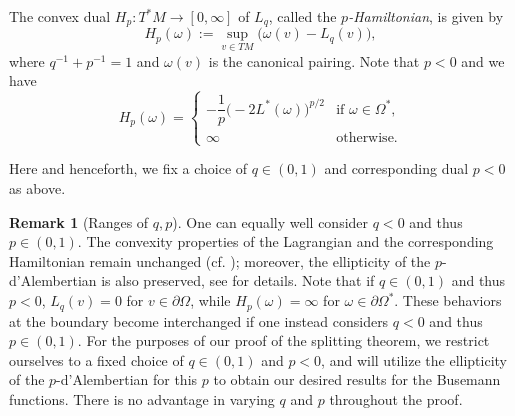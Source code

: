 \documentclass[a4paper,11pt]{article}
\numberwithin{equation}{section}
\theoremstyle{definition}
\newtheorem{remark}[definition]{Remark}
\theoremstyle{plain}
\newcommand{\lra}{\longrightarrow}
\begin{document}
The convex dual $H_p \colon T^*M \lra [0,\infty]$ of $L_q$,
called the \emph{$p$-Hamiltonian}, is given by
\begin{equation*}%
H_p(\omega) := \sup_{v \in TM} \bigl( \omega(v) -L_q(v) \bigr),
\end{equation*}
where $q^{-1}+p^{-1}=1$ and $\omega(v)$ is the canonical pairing.
Note that $p<0$ and we have
\begin{equation}\label{eq:H_p}
H_p(\omega) = \begin{cases}
 -\dfrac{1}{p} \bigl( -2L^*(\omega) \bigr)^{p/2} & \text{if } \omega \in \Omega^*, \\
 \infty & \text{otherwise}.
\end{cases}
\end{equation}

Here and henceforth, we fix a choice of $q \in (0,1)$ and corresponding dual $p < 0$ as above.

\begin{remark}[Ranges of $q,p$]\label{rm:pq}
One can equally well consider $q<0$ and thus $p \in (0,1)$.
The convexity properties of the Lagrangian and the corresponding Hamiltonian remain unchanged (cf.  \cite[Example~3.1]{Min-causality}); moreover, the ellipticity of the $p$-d'Alembertian is also preserved, see \cite{octet, quintet} for details. Note that if $q \in (0,1)$ and thus $p < 0$, $L_q(v) = 0$ for $v \in \partial \Omega$, while $H_p(\omega) = \infty$ for $\omega \in \partial \Omega^*$. These behaviors at the boundary become interchanged if one instead considers $q < 0$ and thus $p \in (0,1)$. For the purposes of our proof of the splitting theorem, we restrict ourselves to a fixed choice of $q \in (0,1)$ and $p < 0$, and will utilize the ellipticity of the $p$-d'Alembertian for this $p$ to obtain our desired results for the Busemann functions. There is no advantage in varying $q$ and $p$ throughout the proof.
\end{remark}
\end{document}
